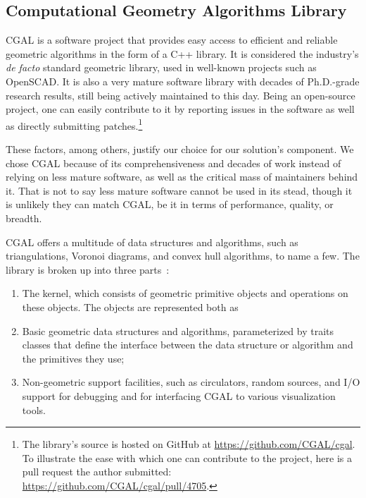 \subsection{Computational Geometry Algorithms Library}%
\label{sec:solution.impl.cgal}

\Ac{CGAL} is a software project that provides easy access to efficient and
reliable geometric algorithms in the form of a C++ library.  It is considered
the industry's \textit{de facto} standard geometric library, used in well-known
projects such as OpenSCAD.  It is also a very mature software library with
decades of Ph.D.-grade research results, still being actively maintained to this
day.  Being an open-source project, one can easily contribute to it by reporting
issues in the software as well as directly submitting patches.\footnote{The
library's source is hosted on GitHub at \url{https://github.com/CGAL/cgal}.  To
illustrate the ease with which one can contribute to the project, here is a pull
request the author submitted: \url{https://github.com/CGAL/cgal/pull/4705}.}

These factors, among others, justify our choice for our solution's \geomlibrary
component.  We chose \ac{CGAL} because of its comprehensiveness and decades of
work instead of relying on less mature software, as well as the critical mass of
maintainers behind it.  That is not to say less mature software cannot be used
in its stead, though it is unlikely they can match \ac{CGAL}, be it in terms of
performance, quality, or breadth.

\ac{CGAL} offers a multitude of data structures and algorithms, such as
triangulations, Voronoi diagrams, and convex hull algorithms, to name a few.
The library is broken up into three parts~\cite{CGAL:5.3:23LGK}:
\begin{enumerate}
  \item The kernel, which consists of geometric primitive objects and operations
  on these objects.  The objects are represented both as
  \item Basic geometric data structures and algorithms, parameterized by traits
  classes that define the interface between the data structure or algorithm and
  the primitives they use;
  \item Non-geometric support facilities, such as circulators, random sources,
  and I/O support for debugging and for interfacing \ac{CGAL} to various
  visualization tools.
\end{enumerate}

